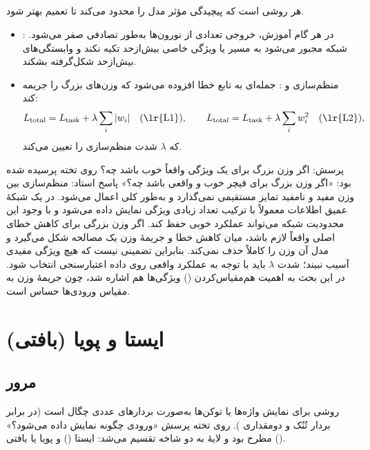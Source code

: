 \subsection{}
 هر روشی است که پیچیدگی مؤثر مدل را محدود می‌کند تا تعمیم بهتر شود.
\begin{itemize}
  \item {}: در هر گام آموزش، خروجی تعدادی از نورون‌ها به‌طور تصادفی صفر می‌شود. شبکه مجبور می‌شود به مسیر یا ویژگی خاصی بیش‌ازحد تکیه نکند و وابستگی‌های بیش‌ازحد شکل‌گرفته بشکند.
  \item منظم‌سازی  و : جمله‌ای به تابع خطا افزوده می‌شود که وزن‌های بزرگ را جریمه کند:
  \[
  L_{\text{total}}=L_{\text{task}}+\lambda\sum_i |w_i|\quad(\text{\lr{L1}}),\qquad
  L_{\text{total}}=L_{\text{task}}+\lambda\sum_i w_i^2\quad(\text{\lr{L2}}),
  \]
  که $\lambda$ شدت منظم‌سازی را تعیین می‌کند.
\end{itemize}

\begin{exambox}{پرسش: اگر وزن بزرگ برای یک ویژگی واقعاً خوب باشد چه؟}
روی تخته پرسیده شده بود: «اگر وزن بزرگ برای فیچر خوب و واقعی باشد چه؟» پاسخ استاد: منظم‌سازی بین وزن مفید و نامفید تمایز مستقیمی نمی‌گذارد و به‌طور کلی اعمال می‌شود. در یک شبکهٔ عمیق اطلاعات معمولاً با ترکیب تعداد زیادی ویژگی نمایش داده می‌شود و با وجود این محدودیت شبکه می‌تواند عملکرد خوبی حفظ کند. اگر وزن بزرگی برای کاهش خطای اصلی واقعاً لازم باشد، میان کاهش خطا و جریمهٔ وزن یک مصالحه شکل می‌گیرد و مدل آن وزن را کاملاً حذف نمی‌کند. بنابراین تضمینی نیست که هیچ ویژگی مفیدی آسیب نبیند؛ شدت $\lambda$ باید با توجه به عملکرد واقعی روی داده اعتبارسنجی انتخاب شود. در این بحث به اهمیت هم‌مقیاس‌کردن () ویژگی‌ها هم اشاره شد، چون جریمهٔ وزن به مقیاس ورودی‌ها حساس است.
\end{exambox}

\section{ ایستا و پویا (بافتی)}

\subsection{مرور}
 روشی برای نمایش واژه‌ها یا توکن‌ها به‌صورت بردارهای عددی چگال است (در برابر بردار تُنُک و دومقداری ). روی تخته پرسش «ورودی چگونه نمایش داده می‌شود؟» مطرح بود و لایهٔ  به دو شاخه تقسیم می‌شد: ایستا () و پویا یا بافتی ().


